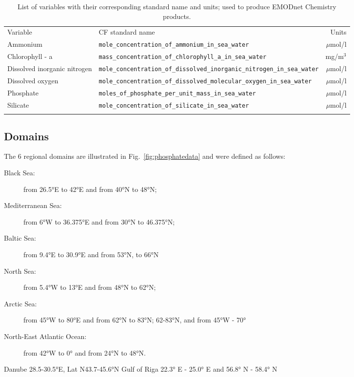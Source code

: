 \documentclass[essd, manuscript]{copernicus}
\begin{document}
\begin{table}
\caption{List of variables with their corresponding standard name and units; used to produce EMODnet Chemistry products.\label{tab:variables}}
\begin{tabular}{llr}
\tophline
Variable 						& CF standard name															& Units			\\ 
\middlehline
Ammonium						& \verb#mole_concentration_of_ammonium_in_sea_water#						& $\mu$mol/l	\\
Chlorophyll - a 				& \verb#mass_concentration_of_chlorophyll_a_in_sea_water#					& mg/m$^3$		\\
Dissolved inorganic nitrogen 	& \verb#mole_concentration_of_dissolved_inorganic_nitrogen_in_sea_water# 	& $\mu$mol/l	\\
Dissolved oxygen 				& \verb#mole_concentration_of_dissolved_molecular_oxygen_in_sea_water#		& $\mu$mol/l	\\
Phosphate 						& \verb#moles_of_phosphate_per_unit_mass_in_sea_water#						& $\mu$mol/l	\\
Silicate 						& \verb#mole_concentration_of_silicate_in_sea_water# 						& $\mu$mol/l	\\
\bottomhline
\end{tabular}
\end{table}

\subsection{Domains}
The 6 regional domains are illustrated in Fig.~\ref{fig:phosphatedata} and were defined as follows:
\begin{description}
\item[Black Sea:] from 26.5°E to 42°E and from 40°N to 48°N;
\item[Mediterranean Sea:] from 6°W to 36.375°E and from 30°N to 46.375°N;
\item[Baltic Sea:] from 9.4°E to 30.9°E and from 53°N, to 66°N
\item[North Sea:] from 5.4°W to 13°E and from 48°N to 62°N;
\item[Arctic Sea:] from 45°W to 80°E and from 62°N to 83°N;  62-83°N, and from 45°W - 70°
\item[North-East Atlantic Ocean:] from 42°W to 0° and from 24°N to 48°N.
\end{description}

Danube 28.5-30.5°E, Lat N43.7-45.6°N
Gulf of Riga 22.3° E - 25.0° E and 56.8° N - 58.4° N
		
\end{document}
